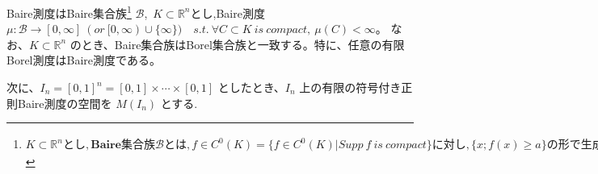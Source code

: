 \documentclass[a4paper]{jsarticle}%
\begin{document}
\begin{dfn}[Baire測度]
Baire測度はBaire集合族\footnote{$ K\subset \mathbb{R}^{n}とし,\mathbf{Baire}集合族 \mathcal{B}とは, f\in C^{0}(K)=\{f\in C^{0}(K)|Supp\ f\ is\ compact\}に対し,\{x;f(x)\geq a\}の形で生成される \mathcal{\sigma-代数}として定義される。
そのSuppを関数の台と言い、位相空間でK\subset \mathbb{R}^{n}とし、f:\ K\rightarrow \mathbb{R}(or\ \mathbb{C})について、関数の台とは、Supp\ f\coloneqq \overline{\{x\in K|f(x)\not = 0\}}=\overline{(K-f^{-1}(0))}\ (ただし上付きバーは閉包(Closure)を表す) $} $ \mathcal{B} $,\ 
$K\subset \mathbb{R}^{n}$とし,Baire測度 $ \mu : \mathcal{B}\rightarrow [0,\infty]\ (or\ [0,\infty)\cup\{\infty\})\quad s.t.\ \forall C\subset K\ is\ compact,\ \mu (C)<\infty 。$
なお、$K\subset \mathbb{R}^{n}$ のとき、Baire集合族はBorel集合族と一致する。特に、任意の有限Borel測度はBaire測度である。
\end{dfn}
次に、$I_n = [0, 1]^n = [0, 1] \times \cdots \times [0, 1]$ としたとき、$I_n$ 上の有限の符号付き正則Baire測度の空間を $M(I_n)$ とする.
\end{document}
